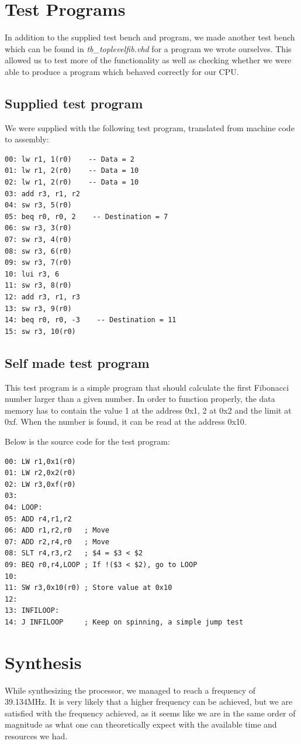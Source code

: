 \section{Test Programs}
In addition to the supplied test bench and program, we made another test bench which can be found in \emph{tb_toplevelfib.vhd} for a program we wrote ourselves.
This allowed us to test more of the functionality as well as checking whether we were able to produce a program which behaved correctly for our CPU.

\subsection{Supplied test program}
We were supplied with the following test program, translated from machine code to assembly:
\begin{verbatim}
00: lw r1, 1(r0)    -- Data = 2
01: lw r1, 2(r0)    -- Data = 10
02: lw r1, 2(r0)    -- Data = 10
03: add r3, r1, r2
04: sw r3, 5(r0)
05: beq r0, r0, 2    -- Destination = 7
06: sw r3, 3(r0)
07: sw r3, 4(r0)
08: sw r3, 6(r0)
09: sw r3, 7(r0)
10: lui r3, 6
11: sw r3, 8(r0)
12: add r3, r1, r3
13: sw r3, 9(r0)
14: beq r0, r0, -3    -- Destination = 11
15: sw r3, 10(r0)
\end{verbatim}

\subsection{Self made test program}
This test program is a simple program that should calculate the first Fibonacci number larger than a given number.
In order to function properly, the data memory has to contain the value 1 at the address 0x1, 2 at 0x2 and the limit at 0xf.
When the number is found, it can be read at the address 0x10.

Below is the source code for the test program:
\begin{verbatim}
00: LW r1,0x1(r0)
01: LW r2,0x2(r0)
02: LW r3,0xf(r0)
03:
04: LOOP:
05: ADD r4,r1,r2
06: ADD r1,r2,r0   ; Move
07: ADD r2,r4,r0   ; Move
08: SLT r4,r3,r2   ; $4 = $3 < $2
09: BEQ r0,r4,LOOP ; If !($3 < $2), go to LOOP
10:
11: SW r3,0x10(r0) ; Store value at 0x10
12:
13: INFILOOP:
14: J INFILOOP     ; Keep on spinning, a simple jump test
\end{verbatim}

\section{Synthesis}
While synthesizing the processor, we managed to reach a frequency of 39.134MHz.
It is very likely that a higher frequency can be achieved, but we are satisfied with the frequency achieved, as it seems like we are in the same order of magnitude as what one can theoretically expect with the available time and resources we had.

